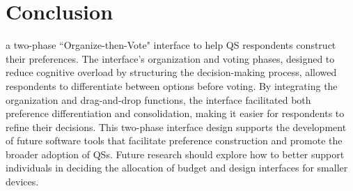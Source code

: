\section{Conclusion}
 a two-phase ``Organize-then-Vote" interface to help QS respondents construct their preferences.  The interface’s organization and voting phases, designed to reduce cognitive overload by structuring the decision-making process, allowed respondents to differentiate between options before voting.  By integrating the organization and drag-and-drop functions, the interface facilitated both preference differentiation and consolidation, making it easier for respondents to refine their decisions. This two-phase interface design supports the development of future software tools that facilitate preference construction and promote the broader adoption of QSs. Future research should explore how to better support individuals in deciding the allocation of budget and design interfaces for smaller devices.
